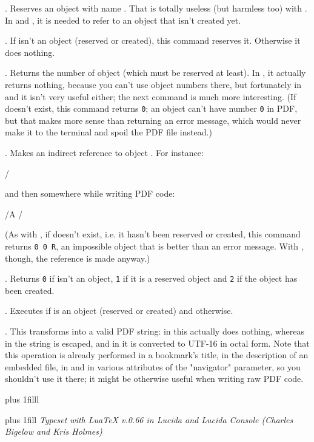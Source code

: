\describe\pdfreserveobject\name.
Reserves an object with name \name. That is totally useless (but harmless too)
with \xetex. In \pdftex and \luatex, it is needed to refer to an object that
isn't created yet.

\describe\pdfensureobject\name.
If \name isn't an object (reserved or created), this command reserves it.
Otherwise it does nothing.

\describe\pdfobjectnumber\name.
Returns the number of object \name (which must be reserved at least). In \xetex,
it actually returns nothing, because you can't use object numbers there,
but fortunately in \pdftex and \luatex it isn't very useful either; the next
command is much more interesting. (If \name doesn't exist, this command returns
\verb"0"; an object can't have number \verb"0" in PDF, but that makes more
sense than returning an error message, which would never make it to the terminal
and spoil the PDF file instead.)

\describe\pdfrefobject\name.
Makes an indirect reference to object \name. For instance:

\verbatim
{}
\verbatim/

and then somewhere while writing PDF code:

\verbatim
/A 
\verbatim/

(As with \com\pdfobjectnumber, if \name doesn't exist, i.e. it hasn't been
reserved or created, this command returns \verb"0 0 R", an impossible object
that is better than an error message. With \xetex, though, the reference is
made anyway.)

\describe\pdfobjectstatus\name.
Returns \verb"0" if \name isn't an object, \verb"1" if it is a reserved object and
\verb"2" if the object has been created.

\describe\ifpdfobject\name{}.
Executes  if \name is an object (reserved or created) and 
otherwise.

\describe\pdfstring{}.
This transforms  into a valid PDF string: in \xetex this
actually does nothing, whereas in \pdftex the string is escaped, and
in \luatex it is converted to UTF-16 in octal form. Note that this operation
is already performed in a bookmark's title, in the description of an
embedded file, in \jumpcom\javascriptaction and in various attributes
of the \param"navigator" parameter,
so you shouldn't use it there; it might be otherwise useful when writing raw PDF code.


\vskip0pt plus 1filll

\bgroup
\leftskip=0pt plus 1fill
\it\obeylines
Typeset with LuaTeX v.0.66
in Lucida and Lucida Console
(Charles Bigelow and Kris Holmes)
\egroup


\finishpdffile
\bye
